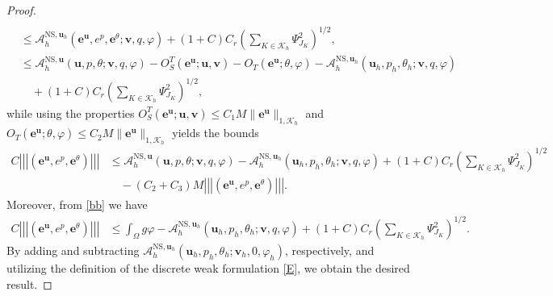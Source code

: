 \documentclass[10pt,a4paper]{article}
\begin{document}
\begin{proof}
\begin{align*}
    \\   & \leq  \mathcal{A}_h^{\mathrm{NS},\boldsymbol{u}_h} (\boldsymbol{e}^{\boldsymbol{u}}, e^p, \boldsymbol{e}^{\theta}; \boldsymbol{v},q, \varphi)  +(1+C) C_r \left( \sum_{K \in \mathcal{K}_h} \Psi_{J_K}^2 \right)^{1/2}, \\& \leq \mathcal{A}_h^{\mathrm{NS},\boldsymbol{u}}(\boldsymbol{u},p, \theta;\boldsymbol{v},q,\varphi) - O_S^T(\boldsymbol{e}^{\boldsymbol{u}}; \boldsymbol{u}, \boldsymbol{v}) -O_T(\boldsymbol{e}^{\boldsymbol{u}}; \theta, \varphi) - \mathcal{A}_h^{\mathrm{NS},\boldsymbol{u}_h} (\boldsymbol{u}_h, p_h, {\theta}_h; \boldsymbol{v},q, \varphi) \\& \quad  +(1+C) C_r \left( \sum_{K \in \mathcal{K}_h} \Psi_{J_K}^2 \right)^{1/2},
   \end{align*}
   while using the properties $ O_S^T(\boldsymbol{e}^{\boldsymbol{u}}; \boldsymbol{u}, \boldsymbol{v}) \leq C_1 M \|\boldsymbol{e}^{\boldsymbol{u}}\|_{1, \mathcal{K}_h}$ and $ O_T(\boldsymbol{e}^{\boldsymbol{u}}; \theta, \varphi) \leq C_2 M \|\boldsymbol{e}^{\boldsymbol{u}}\|_{1, \mathcal{K}_h}$ yields the bounds
   \begin{align*}
        C \left|\!\left|\!\left|(\boldsymbol{e}^{\boldsymbol{u}}, e^p, \boldsymbol{e}^{\theta} )\right|\!\right|\!\right| & \leq \mathcal{A}_h^{\mathrm{NS},\boldsymbol{u}}(\boldsymbol{u},p, \theta;\boldsymbol{v},q,\varphi)  - \mathcal{A}_h^{\mathrm{NS},\boldsymbol{u}_h} (\boldsymbol{u}_h, p_h, {\theta}_h; \boldsymbol{v},q, \varphi)  +(1+C) C_r \left( \sum_{K \in \mathcal{K}_h} \Psi_{J_K}^2 \right)^{1/2} \\ & \quad - (C_2+C_3) M  \left|\!\left|\!\left|(\boldsymbol{e}^{\boldsymbol{u}}, e^p, \boldsymbol{e}^{\theta} )\right|\!\right|\!\right|.
   \end{align*}
   Moreover, from \eqref{bb} we have 
   \begin{align*}
C \left|\!\left|\!\left| ( \boldsymbol{e}^{\boldsymbol{u}}, e^p, \boldsymbol{e}^{\theta} ) \right|\!\right|\!\right| & \leq \int_{\Omega} g \varphi   - \mathcal{A}_h^{\mathrm{NS},\boldsymbol{u}_h} (\boldsymbol{u}_h, p_h, {\theta}_h; \boldsymbol{v},q, \varphi)  +(1+C) C_r \left( \sum_{K \in \mathcal{K}_h} \Psi_{J_K}^2 \right)^{1/2}.
\end{align*}
By adding and subtracting \( \mathcal{A}_h^{\mathrm{NS},\boldsymbol{u}_h}\left(\boldsymbol{u}_h, p_h, \theta_h; \boldsymbol{v}_h, 0, \varphi_h \right) \), respectively, and utilizing the definition of the discrete weak formulation \eqref{E}, we obtain the desired result.
\end{proof}   
\end{document}
